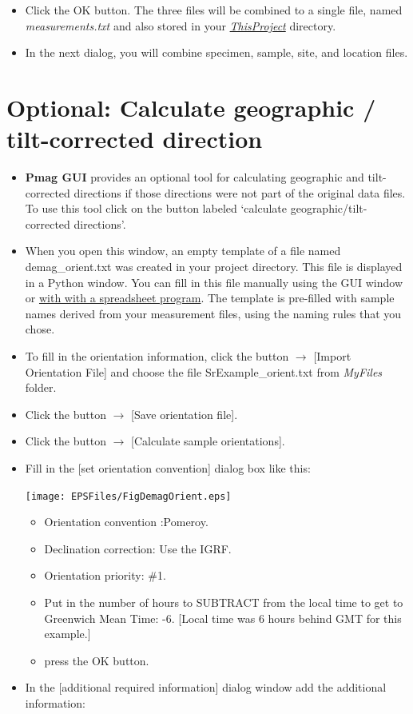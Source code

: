 \documentclass[11pt]{book}
\begin{document}
{{\begin{itemize}
\texttt{[image: EPSFiles/FigCombineMagic.eps]}

\item Click the OK button. The three files will be combined to a single file,  named {\it measurements.txt} and also stored  in your \href{#Project_Directory}{\it ThisProject} directory.

\item In the next dialog, you will combine specimen, sample, site, and location files.
\end{itemize}


\section{Optional: Calculate geographic / tilt-corrected direction}
\begin{itemize}
\item {\bf Pmag GUI} provides an optional tool for calculating geographic and tilt-corrected directions if those directions were not part of the original data files. To use this tool click on the button labeled `calculate geographic/tilt-corrected directions'.

\item When you open this window, an empty template of a file named demag\_orient.txt was created in your project directory. This file is displayed in a Python window. You can fill in  this file manually using the GUI window or \href{#field_info}{with with a spreadsheet program}. The template is pre-filled with sample names derived from your measurement files, using the naming rules that you chose.
\item To fill in the orientation information, click the button $\rightarrow$ [Import Orientation File] and  choose the file SrExample\_orient.txt from {\it MyFiles} folder.
\item Click the button $\rightarrow$ [Save orientation file].
\item Click the button $\rightarrow$ [Calculate sample orientations].
\item Fill in the [set orientation convention] dialog box like this:

\texttt{[image: EPSFiles/FigDemagOrient.eps]}

\begin{itemize}
\item Orientation convention :Pomeroy.
\item Declination correction: Use the IGRF.
\item  Orientation priority: \#1.
\item Put in the number of hours to SUBTRACT from the local time to get to Greenwich Mean Time: -6. [Local time was 6 hours behind GMT for this example.]
\item press the OK button.
\end{itemize}
\item In the [additional required information] dialog window add the additional information:
\end{itemize}

}}
\end{document}
